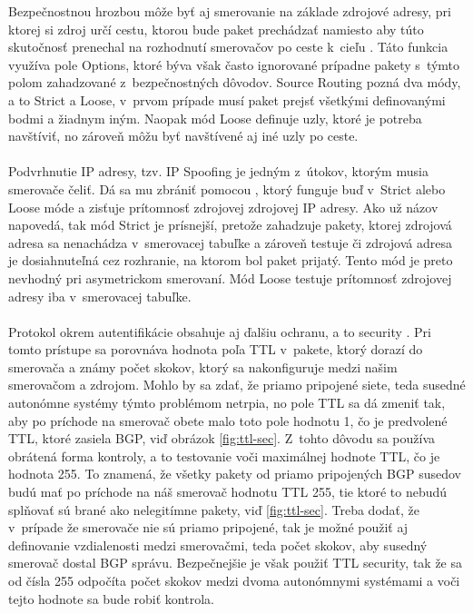 Bezpečnostnou hrozbou môže byť aj smerovanie na základe zdrojové adresy, pri ktorej si zdroj určí cestu, ktorou bude paket prechádzať namiesto aby túto skutočnosť prenechal na rozhodnutí smerovačov po ceste k~cieľu \cite{CIS_DrTLsgXv24lxeIIM}. Táto funkcia využíva pole Options, ktoré býva však často ignorované prípadne pakety s~týmto polom zahadzované z~bezpečnostných dôvodov. Source Routing pozná dva módy, a to Strict a Loose, v~prvom prípade musí paket prejsť všetkými definovanými bodmi a žiadnym iným. Naopak mód Loose definuje uzly, ktoré je potreba navštíviť, no zároveň môžu byť navštívené aj iné uzly po ceste.  
\\\\   
\noindent
Podvrhnutie IP adresy, tzv. IP Spoofing je jedným z~útokov, ktorým musia smerovače čeliť. Dá sa mu zbrániť pomocou  \cite{Jackson2010}, ktorý funguje buď v~Strict alebo Loose móde a zisťuje prítomnosť zdrojovej zdrojovej IP adresy. Ako už názov napovedá, tak mód Strict je prísnejší, pretože zahadzuje pakety, ktorej zdrojová adresa sa nenachádza v~smerovacej tabuľke a zároveň testuje či zdrojová adresa je dosiahnuteľná cez rozhranie, na ktorom bol paket prijatý. Tento mód je preto nevhodný pri asymetrickom smerovaní. Mód Loose testuje prítomnosť zdrojovej adresy iba v~smerovacej tabuľke. 
\\\\   
\noindent
Protokol  okrem autentifikácie obsahuje aj ďalšiu ochranu, a to  security \cite{AlHFaPbj6IbKzbuv}. Pri tomto prístupe sa porovnáva hodnota poľa TTL v~pakete, ktorý dorazí do smerovača a známy počet skokov, ktorý sa nakonfiguruje medzi našim smerovačom a zdrojom. Mohlo by sa zdať, že priamo pripojené siete, teda susedné autonómne systémy týmto problémom netrpia, no pole TTL sa dá zmeniť tak, aby po príchode na smerovač obete malo toto pole hodnotu 1, čo je predvolené TTL, ktoré zasiela BGP, viď obrázok \ref{fig:ttl-sec}. Z~tohto dôvodu sa používa obrátená forma kontroly, a to testovanie voči maximálnej hodnote TTL, čo je hodnota 255. To znamená, že všetky pakety od priamo pripojených BGP susedov budú mať po príchode na náš smerovač hodnotu TTL 255, tie ktoré to nebudú splňovať sú brané ako nelegitímne pakety, viď \ref{fig:ttl-sec}. Treba dodať, že v~prípade že smerovače nie sú priamo pripojené, tak je možné použiť aj definovanie vzdialenosti medzi smerovačmi, teda počet skokov, aby susedný smerovač dostal BGP správu. Bezpečnejšie je však použiť TTL security, tak že sa od čísla 255 odpočíta počet skokov medzi dvoma autonómnymi systémami a voči tejto hodnote sa bude robiť kontrola.

